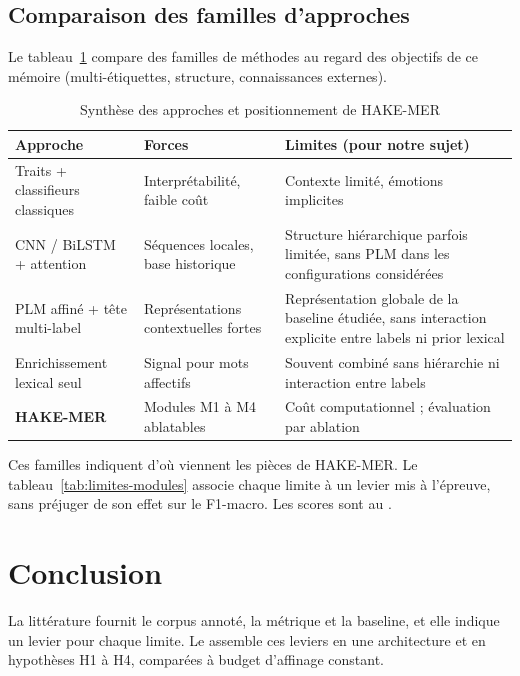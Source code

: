\subsection{Comparaison des familles d'approches}

Le tableau~\ref{tab:synthese_hake_mer} compare des familles de
méthodes au regard des objectifs de ce mémoire (multi-étiquettes,
structure, connaissances externes).

\begin{table}[H]
    \centering
    \caption{Synthèse des approches et positionnement de HAKE-MER}
    \label{tab:synthese_hake_mer}
    \renewcommand{\arraystretch}{1.35}
    \setlength{\tabcolsep}{5pt}
    \begin{tabular}{|p{3.8cm}|p{4.5cm}|p{5.5cm}|}
        \hline
        \textbf{Approche} & \textbf{Forces} & \textbf{Limites (pour notre sujet)} \\
        \hline
        Traits + classifieurs classiques &
        Interprétabilité, faible coût &
        Contexte limité, émotions implicites \\
        \hline
        CNN / BiLSTM + attention &
        Séquences locales, base historique &
        Structure hiérarchique parfois limitée, sans PLM dans les
        configurations considérées \\
        \hline
        PLM affiné + tête multi-label &
        Représentations contextuelles fortes &
        Représentation globale de la baseline étudiée, sans interaction
        explicite entre labels ni prior lexical \\
        \hline
        Enrichissement lexical seul &
        Signal pour mots affectifs &
        Souvent combiné sans hiérarchie ni interaction entre labels \\
        \hline
        \textbf{HAKE-MER} &
        Modules M1 à M4 ablatables &
        Coût computationnel ; évaluation par ablation \\
        \hline
    \end{tabular}
\end{table}

Ces familles indiquent d'où viennent les pièces de HAKE-MER. Le
tableau~\ref{tab:limites-modules} associe chaque limite à un levier
mis à l'épreuve, sans préjuger de son effet sur le F1-macro. Les scores
sont au .

\section*{Conclusion}

La littérature fournit le corpus annoté, la métrique et la baseline, et
elle indique un levier pour chaque limite. Le 
assemble ces leviers en une architecture et en hypothèses H1 à H4,
comparées à budget d'affinage constant.
